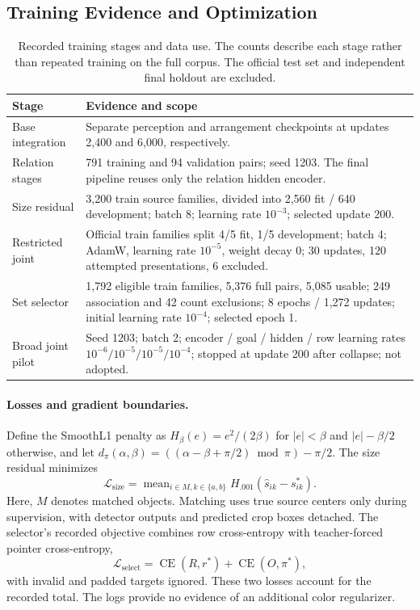 \subsection{Training Evidence and Optimization}
\label{app:training}
\begin{table}[H]
\centering\small
\caption{Recorded training stages and data use. The counts describe each stage rather than repeated training on the full corpus. The official test set and independent final holdout are excluded.}
\begin{tabularx}{\linewidth}{@{}lY@{}}\toprule
\textbf{Stage} & \textbf{Evidence and scope} \\\midrule
Base integration & Separate perception and arrangement checkpoints at updates 2,400 and 6,000, respectively. \\
Relation stages & 791 training and 94 validation pairs; seed 1203. The final pipeline reuses only the relation hidden encoder. \\
Size residual & 3,200 train source families, divided into 2,560 fit / 640 development; batch 8; learning rate $10^{-3}$; selected update 200. \\
Restricted joint & Official train families split 4/5 fit, 1/5 development; batch 4; AdamW, learning rate $10^{-5}$, weight decay 0; 30 updates, 120 attempted presentations, 6 excluded. \\
Set selector & 1,792 eligible train families, 5,376 full pairs, 5,085 usable; 249 association and 42 count exclusions; 8 epochs / 1,272 updates; initial learning rate $10^{-4}$; selected epoch 1. \\
Broad joint pilot & Seed 1203; batch 2; encoder / goal / hidden / row learning rates $10^{-6}/10^{-5}/10^{-5}/10^{-4}$; stopped at update 200 after collapse; not adopted. \\\bottomrule
\end{tabularx}
\end{table}

\paragraph{Losses and gradient boundaries.}
Define the SmoothL1 penalty as $H_\beta(e)=e^2/(2\beta)$ for $|e|<\beta$ and $|e|-\beta/2$ otherwise, and let $d_\pi(\alpha,\beta)=((\alpha-\beta+\pi/2)\bmod\pi)-\pi/2$. The size residual minimizes
\begin{equation}
 \mathcal L_{\mathrm{size}}=\operatorname{mean}_{i\in M,k\in\{a,b\}}H_{.001}(\hat s_{ik}-s^*_{ik}).
\end{equation}
Here, $M$ denotes matched objects. Matching uses true source centers only during supervision, with detector outputs and predicted crop boxes detached. The selector's recorded objective combines row cross-entropy with teacher-forced pointer cross-entropy,
\begin{equation}
 \mathcal L_{\mathrm{select}}=\operatorname{CE}(R,r^*)+\operatorname{CE}(O,\pi^*),
\end{equation}
with invalid and padded targets ignored. These two losses account for the recorded total. The logs provide no evidence of an additional color regularizer.

